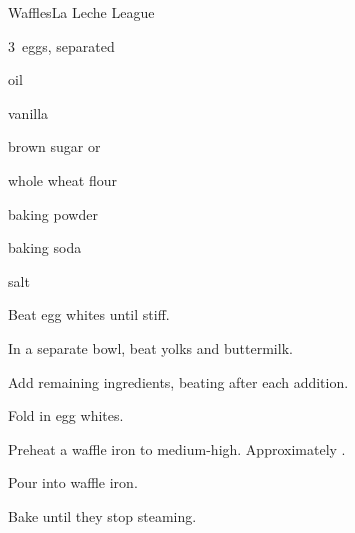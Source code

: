\begin{recipe}{Waffles}{La Leche League}{}

\begin{ingredients}
\item 3~eggs, separated
\item {} 
\item \C{\quarter} oil
\item {} vanilla
\item {} brown sugar or 
\item \C{2\half} whole wheat flour
\item {} baking powder
\item \tp{\half} baking soda
\item \tp{\half} salt
\end{ingredients}

\begin{directions}
\item Beat egg whites until stiff.
\item In a separate bowl, beat yolks and buttermilk.
\item Add remaining ingredients, beating after each addition.
\item Fold in egg whites.
\item Preheat a waffle iron to medium-high. Approximately .
\item Pour into waffle iron.
\item Bake until they stop steaming.
\end{directions}

\end{recipe}
